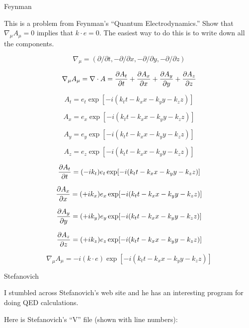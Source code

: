 \parindent=0pt

\beginsection Feynman

This is a problem from Feynman's ``Quantum Electrodynamics.''
Show that $\nabla_\mu A_\mu=0$ implies that $k\cdot e=0$.
The easiest way to do this is to write down all the components.

$$\nabla_\mu=(\partial/\partial t, -\partial/\partial x, -\partial/\partial y, -\partial/\partial z)$$

$$\nabla_\mu A_\mu=\nabla\cdot A={\partial A_t\over\partial t}+{\partial A_x\over\partial x}+{\partial A_y\over\partial y}+{\partial A_z\over\partial z}$$

$$A_t=e_t\exp[-i(k_tt-k_xx-k_yy-k_zz)]$$

$$A_x=e_x\exp[-i(k_tt-k_xx-k_yy-k_zz)]$$

$$A_y=e_y\exp[-i(k_tt-k_xx-k_yy-k_zz)]$$

$$A_z=e_z\exp[-i(k_tt-k_xx-k_yy-k_zz)]$$

$${\partial A_t\over\partial t}=(-ik_t)e_t\exp[-i(k_tt-k_xx-k_yy-k_zz)]$$

$${\partial A_x\over\partial x}=(+ik_x)e_x\exp[-i(k_tt-k_xx-k_yy-k_zz)]$$

$${\partial A_y\over\partial y}=(+ik_y)e_y\exp[-i(k_tt-k_xx-k_yy-k_zz)]$$

$${\partial A_z\over\partial z}=(+ik_z)e_z\exp[-i(k_tt-k_xx-k_yy-k_zz)]$$

$$\nabla_\mu A_\mu=-i(k\cdot e)\exp[-i(k_tt-k_xx-k_yy-k_zz)]$$

\beginsection Stefanovich

I stumbled across Stefanovich's web site and he has an interesting program
for doing QED calculations.

Here is Stefanovich's ``V'' file (shown with line numbers):

